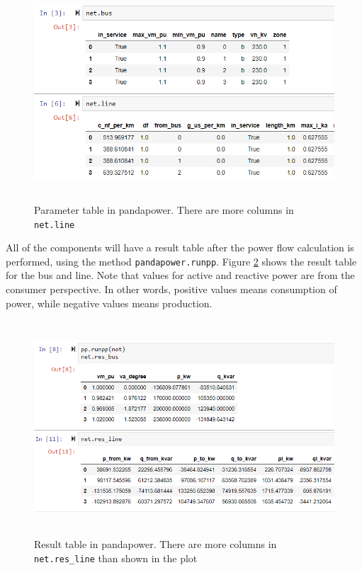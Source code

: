 \documentclass[class=book, crop=false, 11pt]{standalone}
\begin{document}
\begin{figure}[H]
    \includegraphics[height=8cm, width=13.5cm]{figures/case4g_line_bus.PNG}
    \caption {Parameter table in pandapower. There are more columns in \texttt{net.line}}
    \label{fig:method:line_bus_dataframe}
\end{figure}
All of the components will have a result table after the power flow calculation is performed, using the method \texttt{pandapower.runpp}. Figure \ref{fig:method:res_line_bus_dataframe} shows the result table for the bus and line. Note that values for active and reactive power are from the consumer perspective. In other words, positive values means consumption of power, while negative values means production.

\begin{figure}[H]
    \includegraphics[height=8cm, width=14cm]{figures/case4g_line_bus_res.PNG}
    \caption {Result table in pandapower. There are more columns in \texttt{net.res\_line} than shown in the plot}
    \label{fig:method:res_line_bus_dataframe}
\end{figure}
\end{document}
